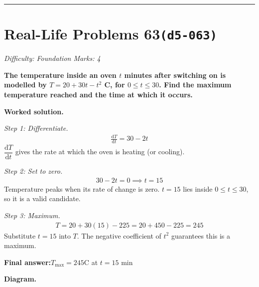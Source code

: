 \documentclass[11pt]{article}
\newcommand{\question}[1]{\par\medskip\noindent\textbf{#1}\par}
\begin{document}
\medskip\hrule

\section*{Real-Life Problems 63\quad\small\texttt{(d5-063)}}
\textit{Difficulty: Foundation \quad\textbar\quad Marks: 4}

\question{The temperature inside an oven \( t \) minutes after switching on is modelled by \( T = 20 + 30t - t^2 \) \textdegree C, for \( 0 \le t \le 30 \). Find the maximum temperature reached and the time at which it occurs.}

\textbf{Worked solution.}

\textit{Step 1: Differentiate.}
\[\begin{gathered}
\frac{\mathrm{d}T}{\mathrm{d}t} = 30 - 2t
\end{gathered}\]
\( \dfrac{\mathrm{d}T}{\mathrm{d}t} \) gives the rate at which the oven is heating (or cooling).

\textit{Step 2: Set to zero.}
\[\begin{gathered}
30 - 2t = 0 \implies t = 15
\end{gathered}\]
Temperature peaks when its rate of change is zero. \( t = 15 \) lies inside \( 0 \le t \le 30 \), so it is a valid candidate.

\textit{Step 3: Maximum.}
\[\begin{gathered}
T = 20 + 30(15) - 225 = 20 + 450 - 225 = 245
\end{gathered}\]
Substitute \( t = 15 \) into \( T \). The negative coefficient of \( t^2 \) guarantees this is a maximum.

\begin{answerbox}
\textbf{Final answer:}\quad \(\displaystyle  T_{\max} = 245 \)\textdegree C at \(\displaystyle  t = 15 \) min
\end{answerbox}
\textbf{Diagram.}
\end{document}
